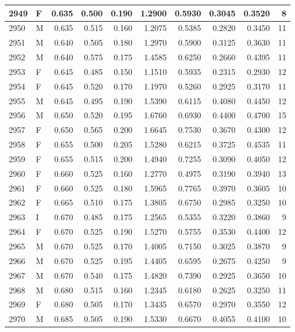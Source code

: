 \documentclass[9pt,twocolumn,twoside,]{pnas-new}
\begin{document}
\begin{tabular}{l|l|r|r|r|r|r|r|r|r}
\hline
2949 & F & 0.635 & 0.500 & 0.190 & 1.2900 & 0.5930 & 0.3045 & 0.3520 & 8\\
\hline
2950 & M & 0.635 & 0.515 & 0.160 & 1.2075 & 0.5385 & 0.2820 & 0.3450 & 11\\
\hline
2951 & M & 0.640 & 0.505 & 0.180 & 1.2970 & 0.5900 & 0.3125 & 0.3630 & 11\\
\hline
2952 & M & 0.640 & 0.575 & 0.175 & 1.4585 & 0.6250 & 0.2660 & 0.4395 & 11\\
\hline
2953 & F & 0.645 & 0.485 & 0.150 & 1.1510 & 0.5935 & 0.2315 & 0.2930 & 12\\
\hline
2954 & F & 0.645 & 0.520 & 0.170 & 1.1970 & 0.5260 & 0.2925 & 0.3170 & 11\\
\hline
2955 & M & 0.645 & 0.495 & 0.190 & 1.5390 & 0.6115 & 0.4080 & 0.4450 & 12\\
\hline
2956 & M & 0.650 & 0.520 & 0.195 & 1.6760 & 0.6930 & 0.4400 & 0.4700 & 15\\
\hline
2957 & F & 0.650 & 0.565 & 0.200 & 1.6645 & 0.7530 & 0.3670 & 0.4300 & 12\\
\hline
2958 & F & 0.655 & 0.500 & 0.205 & 1.5280 & 0.6215 & 0.3725 & 0.4535 & 11\\
\hline
2959 & F & 0.655 & 0.515 & 0.200 & 1.4940 & 0.7255 & 0.3090 & 0.4050 & 12\\
\hline
2960 & F & 0.660 & 0.525 & 0.160 & 1.2770 & 0.4975 & 0.3190 & 0.3940 & 13\\
\hline
2961 & F & 0.660 & 0.525 & 0.180 & 1.5965 & 0.7765 & 0.3970 & 0.3605 & 10\\
\hline
2962 & F & 0.665 & 0.510 & 0.175 & 1.3805 & 0.6750 & 0.2985 & 0.3250 & 10\\
\hline
2963 & I & 0.670 & 0.485 & 0.175 & 1.2565 & 0.5355 & 0.3220 & 0.3860 & 9\\
\hline
2964 & F & 0.670 & 0.525 & 0.190 & 1.5270 & 0.5755 & 0.3530 & 0.4400 & 12\\
\hline
2965 & M & 0.670 & 0.525 & 0.170 & 1.4005 & 0.7150 & 0.3025 & 0.3870 & 9\\
\hline
2966 & M & 0.670 & 0.525 & 0.195 & 1.4405 & 0.6595 & 0.2675 & 0.4250 & 9\\
\hline
2967 & M & 0.670 & 0.540 & 0.175 & 1.4820 & 0.7390 & 0.2925 & 0.3650 & 10\\
\hline
2968 & M & 0.680 & 0.515 & 0.160 & 1.2345 & 0.6180 & 0.2625 & 0.3250 & 11\\
\hline
2969 & F & 0.680 & 0.505 & 0.170 & 1.3435 & 0.6570 & 0.2970 & 0.3550 & 12\\
\hline
2970 & M & 0.685 & 0.505 & 0.190 & 1.5330 & 0.6670 & 0.4055 & 0.4100 & 10\\

\end{tabular}
\end{document}
